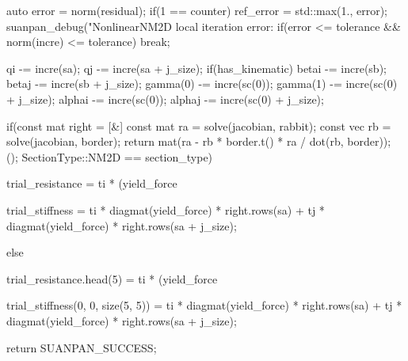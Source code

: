 \begin{cppcode}
{{        auto error = norm(residual);
        if(1 == counter) ref_error = std::max(1., error);
        suanpan_debug("NonlinearNM2D local iteration error: %
        if(error <= tolerance && norm(incre) <= tolerance) break;

        qi -= incre(sa);
        qj -= incre(sa + j_size);
        if(has_kinematic) {
            betai -= incre(sb);
            betaj -= incre(sb + j_size);
        }
        gamma(0) -= incre(sc(0));
        gamma(1) -= incre(sc(0) + j_size);
        alphai -= incre(sc(0));
        alphaj -= incre(sc(0) + j_size);
    }

    if(const mat right = [&] {
        const mat ra = solve(jacobian, rabbit);
        const vec rb = solve(jacobian, border);
        return mat(ra - rb * border.t() * ra / dot(rb, border));
    }(); SectionType::NM2D == section_type) {
        trial_resistance = ti * (yield_force %

        trial_stiffness = ti * diagmat(yield_force) * right.rows(sa) + tj * diagmat(yield_force) * right.rows(sa + j_size);
    }
    else {
        trial_resistance.head(5) = ti * (yield_force %

        trial_stiffness(0, 0, size(5, 5)) = ti * diagmat(yield_force) * right.rows(sa) + tj * diagmat(yield_force) * right.rows(sa + j_size);
    }

    return SUANPAN_SUCCESS;
}
\end{cppcode}